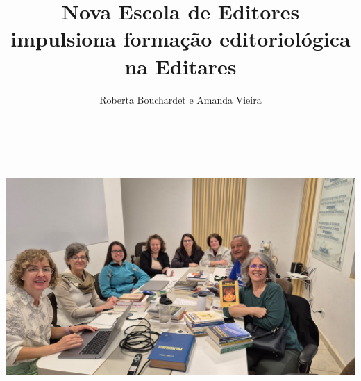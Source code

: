 \documentclass{gescons}
\author{Roberta Bouchardet e Amanda Vieira}
\title{Nova Escola de Editores impulsiona formação editoriológica na Editares}
\begin{document}
    \makeentrevistatitle


    
    
\begin{center}
    \includegraphics[height=10cm]{articles/atualizacoes/fotos/escola-editores/escola-editores4.jpeg} 
\end{center}
    
\end{document}
